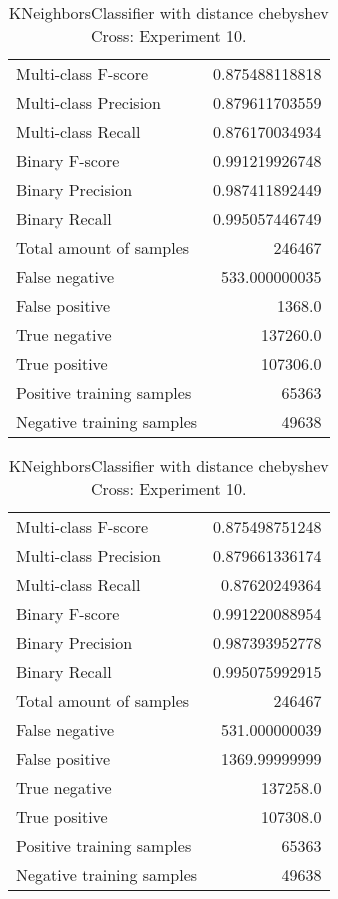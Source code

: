 \begin{table}[H]
\begin{minipage}{0.5\textwidth}
\caption{KNeighborsClassifier with distance chebyshev Cross: Experiment 9.}
\centering
\begin{tabular}{l r}
\toprule
Multi-class F-score & 0.875488118818 \\
Multi-class Precision & 0.879611703559 \\
Multi-class Recall & 0.876170034934 \\
\midrule
Binary F-score & 0.991219926748 \\
Binary Precision & 0.987411892449 \\
Binary Recall & 0.995057446749 \\
\midrule
Total amount of samples & 246467 \\
False negative & 533.000000035 \\
False positive & 1368.0 \\
True negative & 137260.0 \\
True positive & 107306.0 \\
\midrule
Positive training samples & 65363 \\
Negative training samples & 49638 \\
\bottomrule
\end{tabular}
\end{minipage}
\hfillx
\begin{minipage}{0.5\textwidth}
\caption{KNeighborsClassifier with distance chebyshev Cross: Experiment 10.}
\centering
\begin{tabular}{l r}
\toprule
Multi-class F-score & 0.875498751248 \\
Multi-class Precision & 0.879661336174 \\
Multi-class Recall & 0.87620249364 \\
\midrule
Binary F-score & 0.991220088954 \\
Binary Precision & 0.987393952778 \\
Binary Recall & 0.995075992915 \\
\midrule
Total amount of samples & 246467 \\
False negative & 531.000000039 \\
False positive & 1369.99999999 \\
True negative & 137258.0 \\
True positive & 107308.0 \\
\midrule
Positive training samples & 65363 \\
Negative training samples & 49638 \\
\bottomrule
\end{tabular}
\end{minipage}
\end{table}
